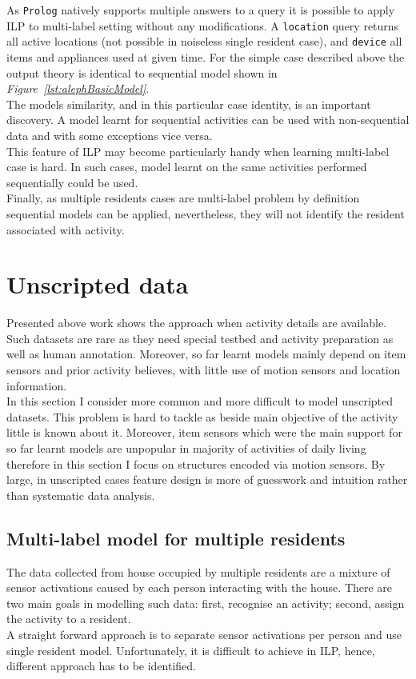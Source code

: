 \documentclass[10pt, a4paper, pdflatex, leqno, twoside, openright]{report}
\begin{document}
As \texttt{Prolog} natively supports multiple answers to a query it is possible to apply ILP to multi-label setting without any modifications. A \texttt{location} query returns all active locations (not possible in noiseless single resident case), and \texttt{device} all items and appliances used at given time. For the simple case described above the output theory is identical to sequential model shown in \emph{Figure~\ref{lst:alephBasicModel}}.\\

The models similarity, and in this particular case identity, is an important discovery. A model learnt for sequential activities can be used with non-sequential data and with some exceptions vice versa.\\
This feature of ILP may become particularly handy when learning multi-label case is hard. In such cases, model learnt on the same activities performed sequentially could be used.\\
Finally, as multiple residents cases are multi-label problem by definition sequential models can be applied, nevertheless, they will not identify the resident associated with activity.

  \section{Unscripted data}
Presented above work shows the approach when activity details are available. Such datasets are rare as they need special testbed and activity preparation as well as human annotation. Moreover, so far learnt models mainly depend on item sensors and prior activity believes, with little use of motion sensors and location information.\\

In this section I consider more common and more difficult to model unscripted datasets. This problem is hard to tackle as beside main objective of the activity little is known about it. Moreover, item sensors which were the main support for so far learnt models are unpopular in majority of activities of daily living therefore in this section I focus on structures encoded via motion sensors. By large, in unscripted cases feature design is more of guesswork and intuition rather than systematic data analysis.

    \subsection{Multi-label model for multiple residents\label{ch:mlm}}
The data collected from house occupied by multiple residents are a mixture of sensor activations caused by each person interacting with the house. There are two main goals in modelling such data: first, recognise an activity; second, assign the activity to a resident.\\
A straight forward approach is to separate sensor activations per person and use single resident model. Unfortunately, it is difficult to achieve in ILP, hence, different approach has to be identified.\\
\end{document}
